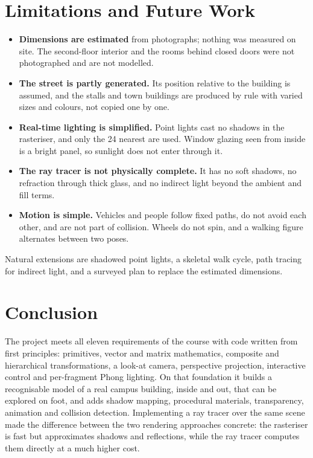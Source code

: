 \documentclass[11pt,a4paper]{article}
\begin{document}
\section{Limitations and Future Work}
\begin{itemize}
\item \textbf{Dimensions are estimated} from photographs; nothing was
measured on site. The second-floor interior and the rooms behind closed
doors were not photographed and are not modelled.
\item \textbf{The street is partly generated.} Its position relative to the
building is assumed, and the stalls and town buildings are produced by rule
with varied sizes and colours, not copied one by one.
\item \textbf{Real-time lighting is simplified.} Point lights cast no
shadows in the rasteriser, and only the 24 nearest are used. Window glazing
seen from inside is a bright panel, so sunlight does not enter through it.
\item \textbf{The ray tracer is not physically complete.} It has no soft
shadows, no refraction through thick glass, and no indirect light beyond
the ambient and fill terms.
\item \textbf{Motion is simple.} Vehicles and people follow fixed paths,
do not avoid each other, and are not part of collision. Wheels do not spin,
and a walking figure alternates between two poses.
\end{itemize}
Natural extensions are shadowed point lights, a skeletal walk cycle, path
tracing for indirect light, and a surveyed plan to replace the estimated
dimensions.

\section{Conclusion}
The project meets all eleven requirements of the course with code written
from first principles: primitives, vector and matrix mathematics, composite
and hierarchical transformations, a look-at camera, perspective projection,
interactive control and per-fragment Phong lighting. On that foundation it
builds a recognisable model of a real campus building, inside and out, that
can be explored on foot, and adds shadow mapping, procedural materials,
transparency, animation and collision detection. Implementing a ray tracer
over the same scene made the difference between the two rendering
approaches concrete: the rasteriser is fast but approximates shadows and
reflections, while the ray tracer computes them directly at a much higher
cost.
\end{document}
